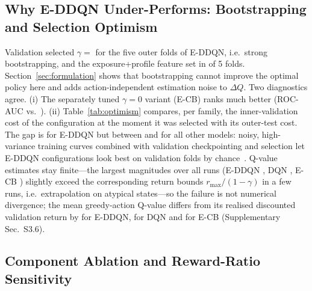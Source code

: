 \subsection{Why E-DDQN Under-Performs: Bootstrapping and Selection Optimism}
\label{sec:why}
Validation selected $\gamma=$ \EDDQNGammas{} for the five outer folds of E-DDQN, i.e.\ strong bootstrapping, and the exposure+profile feature set in \EDDQNnProfile{} of 5 folds. Section~\ref{sec:formulation} shows that bootstrapping cannot improve the optimal policy here and adds action-independent estimation noise to $\Delta Q$. Two diagnostics agree. (i) The separately tuned $\gamma=0$ variant (E-CB) ranks much better (ROC-AUC \ECBCostRocAucMean{} vs.\ \EDDQNCostRocAucMean). (ii) Table~\ref{tab:optimism} compares, per family, the inner-validation cost of the configuration at the moment it was selected with its outer-test cost. The gap is \EDDQNOptGap{} for E-DDQN but between \RFOptGap{} and \ECBOptGap{} for all other models: noisy, high-variance training curves combined with validation checkpointing and selection let E-DDQN configurations look best on validation folds by chance~\cite{varma2006bias}. Q-value estimates stay finite---the largest magnitudes over all runs (E-DDQN \EDDQNQAbsMax, DQN \DQNQAbsMax, E-CB \ECBQAbsMax) slightly exceed the corresponding return bounds $r_{\max}/(1-\gamma)$ in a few runs, i.e.\ extrapolation on atypical states---so the failure is not numerical divergence; the mean greedy-action Q-value differs from its realised discounted validation return by \EDDQNOverest{} for E-DDQN, \DQNOverest{} for DQN and \ECBOverest{} for E-CB (Supplementary Sec.~S3.6).

\begin{table}[t]
\centering
\caption{Selection optimism: pooled inner-validation 5:1 cost of the selected configuration (HPO seed) versus its outer-test cost (mean over folds and seeds).}
\label{tab:optimism}
\resizebox{\columnwidth}{!}{}
\end{table}

\subsection{Component Ablation and Reward-Ratio Sensitivity}
\label{sec:ablation}



